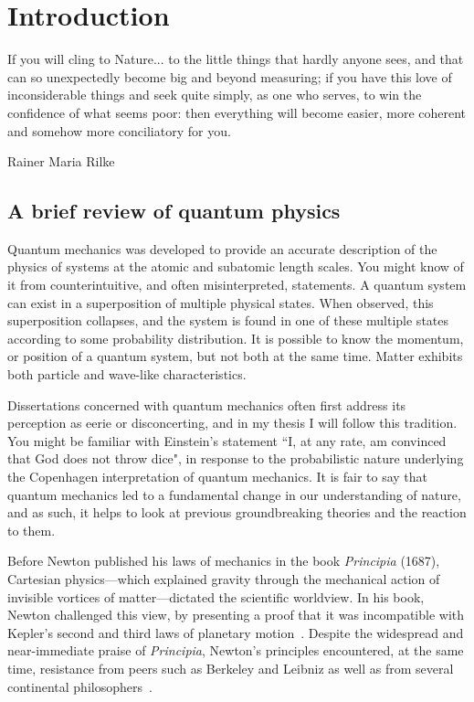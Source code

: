 \documentclass[main.tex]{subfiles}
\begin{document}
\clearpage
\thispagestyle{empty}
\mbox{}
\clearpage

\setcounter{page}{1}

\chapter{Introduction}\label{chap:introduction}
\epigraph{If you will cling to Nature... to the little things that hardly anyone sees, and that can so unexpectedly become big and beyond measuring; if you have this love of inconsiderable things and seek quite simply, as one who serves, to win the confidence of what seems poor: then everything will become easier, more coherent and somehow more conciliatory for you.}{Rainer Maria Rilke}

\section{A brief review of quantum physics}
Quantum mechanics was developed to provide an accurate description of the physics of systems at the atomic and subatomic length scales. You might know of it from counterintuitive, and often misinterpreted, statements. A quantum system can exist in a superposition of multiple physical states. When observed, this superposition collapses, and the system is found in one of these multiple states according to some probability distribution. It is possible to know the momentum, or position of a quantum system, but not both at the same time. Matter exhibits both particle and wave-like characteristics. 

Dissertations concerned with quantum mechanics often first address its perception as eerie or disconcerting, and in my thesis I will follow this tradition. You might be familiar with Einstein's statement ``I, at any rate, am convinced that God does not throw dice", in response to the probabilistic nature underlying the Copenhagen interpretation of quantum mechanics. It is fair to say that quantum mechanics led to a fundamental change in our understanding of nature, and as such, it helps to look at previous groundbreaking theories and the reaction to them. 

Before Newton published his laws of mechanics in the book \emph{Principia} (1687), Cartesian physics---which explained gravity through the mechanical action of invisible vortices of matter---dictated the scientific worldview. In his book, Newton challenged this view, by presenting a proof that it was incompatible with Kepler's second and third laws of planetary motion~\cite{Newton1687Principia}.  Despite the widespread and near-immediate praise of \emph{Principia}, Newton's principles encountered, at the same time, resistance from peers such as Berkeley and Leibniz as well as from several continental philosophers~\cite{mcmullin2001impact}. 
\end{document}
